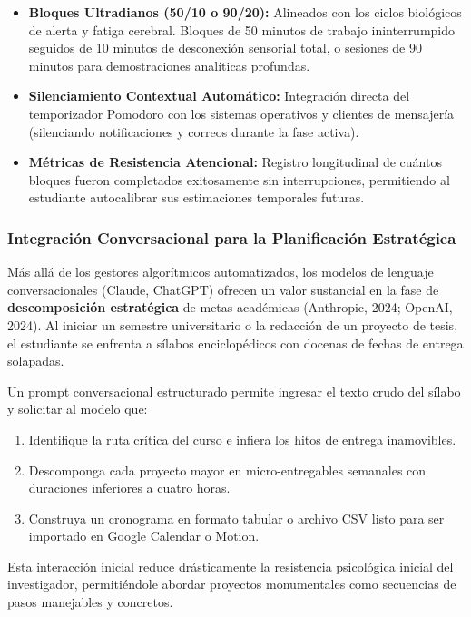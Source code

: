\begin{itemize}
    \item \textbf{Bloques Ultradianos (50/10 o 90/20):} Alineados con los ciclos biológicos de alerta y fatiga cerebral. Bloques de 50 minutos de trabajo ininterrumpido seguidos de 10 minutos de desconexión sensorial total, o sesiones de 90 minutos para demostraciones analíticas profundas.
    \item \textbf{Silenciamiento Contextual Automático:} Integración directa del temporizador Pomodoro con los sistemas operativos y clientes de mensajería (silenciando notificaciones y correos durante la fase activa).
    \item \textbf{Métricas de Resistencia Atencional:} Registro longitudinal de cuántos bloques fueron completados exitosamente sin interrupciones, permitiendo al estudiante autocalibrar sus estimaciones temporales futuras.
\end{itemize}

\subsubsection{Integración Conversacional para la Planificación Estratégica}

Más allá de los gestores algorítmicos automatizados, los modelos de lenguaje conversacionales (Claude, ChatGPT) ofrecen un valor sustancial en la fase de \textbf{descomposición estratégica} de metas académicas (Anthropic, 2024; OpenAI, 2024). Al iniciar un semestre universitario o la redacción de un proyecto de tesis, el estudiante se enfrenta a sílabos enciclopédicos con docenas de fechas de entrega solapadas.

Un prompt conversacional estructurado permite ingresar el texto crudo del sílabo y solicitar al modelo que:
\begin{enumerate}
    \item Identifique la ruta crítica del curso e infiera los hitos de entrega inamovibles.
    \item Descomponga cada proyecto mayor en micro-entregables semanales con duraciones inferiores a cuatro horas.
    \item Construya un cronograma en formato tabular o archivo CSV listo para ser importado en Google Calendar o Motion.
\end{enumerate}

Esta interacción inicial reduce drásticamente la resistencia psicológica inicial del investigador, permitiéndole abordar proyectos monumentales como secuencias de pasos manejables y concretos.


